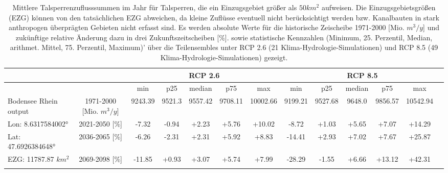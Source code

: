 \renewcommand{\arraystretch}{1.2}
\addtolength{\tabcolsep}{-5.9pt}
\scriptsize
\begin{longtable}{@{\extracolsep{\fill}}lc|ccccc||cccccc}
\caption{Mittlere Talsperrenzuflusssummen im Jahr für Talsperren, die ein Einzugsgebiet größer als $50 km^2$ aufweisen. Die Einzugsgebietsgrößen (EZG) können von den tatsächlichen EZG abweichen, da kleine Zuflüsse eventuell nicht berücksichtigt werden bzw. Kanalbauten in stark anthropogen überprägten Gebieten nicht erfasst sind. Es werden absolute Werte für die historische Zeischeibe 1971-2000 [Mio. $m^3/y$] und zukünftige relative Änderung dazu in drei Zukunftszeitscheiben [\%]. sowie statistische Kennzahlen (Minimum, 25. Perzentil, Median, arithmet. Mittel, 75. Perzentil, Maximum)' über die Teilensembles unter RCP 2.6 (21 Klima-Hydrologie-Simulationen) und RCP 8.5 (49 Klima-Hydrologie-Simulationen) gezeigt.}\\  \hline
\multicolumn{2}{c}{} & \multicolumn{5}{c||}{RCP 2.6}  & \multicolumn{6}{c}{RCP 8.5}\\ \hline
\multicolumn{2}{c|}{} & min & p25 & median & p75 & max & min & p25 & median & p75 & max\\ 
\hline 
Bodensee Rhein output & 1971-2000 [Mio. $m^3/y$]  & 9243.39 & 9521.3 & 9557.42 & 9708.11 & 10002.66 & 9199.21 & 9527.68 & 9648.0 & 9856.57 & 10542.94 & \\ 
\cline{2-13} 
Lon: 8.6317584002° & 2021-2050 [\%]  & -7.32 & -0.94 & +2.23 & +5.76 & +10.02 & -8.72 & +1.03 & +5.65 & +7.07 & +14.29 & \\ 
Lat: 47.6926384648° & 2036-2065 [\%]  & -6.26 & -2.31 & +2.31 & +5.92 & +8.83 & -14.41 & +2.93 & +7.02 & +7.67 & +25.87 & \\ 
EZG: 11787.87 $km^2$ & 2069-2098 [\%]  & -11.85 & +0.93 & +3.07 & +5.74 & +7.99 & -28.29 & -1.55 & +6.66 & +13.12 & +42.31 & \\\hline
\label{Qrouted_daily_sum_Talsperrenforlatex}
\end{longtable}
\addtolength{\tabcolsep}{5.9pt}
